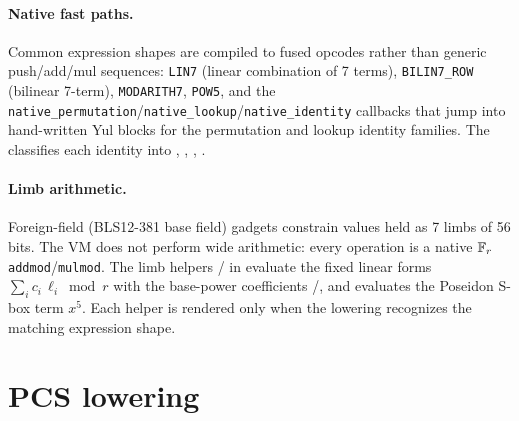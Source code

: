 \paragraph{Native fast paths.} Common expression shapes are compiled to
fused opcodes rather than generic push/add/mul sequences:
\texttt{LIN7} (linear combination of 7 terms), \texttt{BILIN7\_ROW}
(bilinear 7-term), \texttt{MODARITH7}, \texttt{POW5}, and the
\texttt{native\_\allowbreak{}permutation}/\texttt{native\_lookup}/\texttt{native\_identity}
callbacks that jump into hand-written Yul blocks for the permutation and
lookup identity families. The  classifies each
identity into , ,
, .

\paragraph{Limb arithmetic.} Foreign-field (BLS12-381 base field) gadgets
constrain values held as 7 limbs of 56 bits. The VM does not perform wide
arithmetic: every operation is a native $\mathbb{F}_r$ \texttt{addmod}/\texttt{mulmod}.
The limb helpers / in
 evaluate the fixed linear forms
$\sum_i c_i\,\ell_i \bmod r$ with the base-power coefficients
/, and 
evaluates the Poseidon S-box term $x^5$. Each helper is rendered only when
the lowering recognizes the matching expression shape.

\section{PCS lowering}
\label{sec:pcs-codegen}

